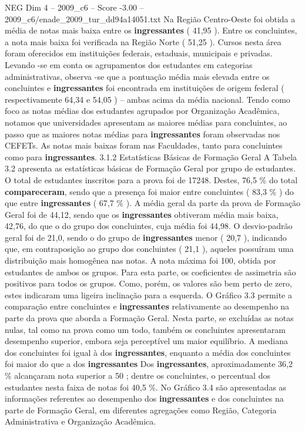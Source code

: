 \begin{textsample}{NEG Dim 4 – 2009\_c6 – Score -3.00 – 2009\_c6/enade\_2009\_tur\_dd94a14051.txt}
Na Região Centro-Oeste foi obtida a média de notas mais baixa entre os \textbf{ingressantes} ( 41,95 ).
Entre os concluintes, a nota mais baixa foi verificada na Região Norte ( 51,25 ).
Cursos nesta área foram oferecidos em instituições federais, estaduais, municipais e privadas.
Levando -se em conta os agrupamentos dos estudantes em categorias administrativas, observa -se que a pontuação média mais elevada entre os concluintes e \textbf{ingressantes} foi encontrada em instituições de origem federal ( respectivamente 64,34 e 54,05 ) – ambas acima da média nacional.
Tendo como foco as notas médias dos estudantes agrupados por Organização Acadêmica, notamos que universidades apresentam as maiores médias para concluintes, ao passo que as maiores notas médias para \textbf{ingressantes} foram observadas nos CEFETs.
As notas mais baixas foram nas Faculdades, tanto para concluintes como para \textbf{ingressantes}. 3.1.2 Estatísticas Básicas de Formação Geral A Tabela 3.2 apresenta as estatísticas básicas de Formação Geral por grupo de estudantes.
O total de estudantes inscritos para a prova foi de 17248.
Destes, 76,5 \% do total \textbf{compareceram}, sendo que a presença foi maior entre concluintes ( 83,3 \% ) do que entre \textbf{ingressantes} ( 67,7 \% ).
A média geral da parte da prova de Formação Geral foi de 44,12, sendo que os \textbf{ingressantes} obtiveram média mais baixa, 42,76, do que o do grupo dos concluintes, cuja média foi 44,98.
O desvio-padrão geral foi de 21,0, sendo o do grupo de \textbf{ingressantes} menor ( 20,7 ), indicando que, em contraposição ao grupo dos concluintes ( 21,1 ), aqueles possuíram uma distribuição mais homogênea nas notas.
A nota máxima foi 100, obtida por estudantes de ambos os grupos.
Para esta parte, os coeficientes de assimetria são positivos para todos os grupos.
Como, porém, os valores são bem perto de zero, estes indicaram uma ligeira inclinação para a esquerda.
O Gráfico 3.3 permite a comparação entre concluintes e \textbf{ingressantes} relativamente ao desempenho na parte da prova que aborda a Formação Geral.
Nesta parte, se excluídas as notas nulas, tal como na prova como um todo, também os concluintes apresentaram desempenho superior, embora seja perceptível um maior equilíbrio.
A mediana dos concluintes foi igual à dos \textbf{ingressantes}, enquanto a média dos concluintes foi maior do que a dos \textbf{ingressantes} Dos \textbf{ingressantes}, aproximadamente 36,2 \% alcançaram nota superior a 50 ; dentre os concluintes, o percentual dos estudantes nesta faixa de notas foi 40,5 \%.
No Gráfico 3.4 são apresentadas as informações referentes ao desempenho dos \textbf{ingressantes} e dos concluintes na parte de Formação Geral, em diferentes agregações como Região, Categoria Administrativa e Organização Acadêmica.

\end{textsample}
